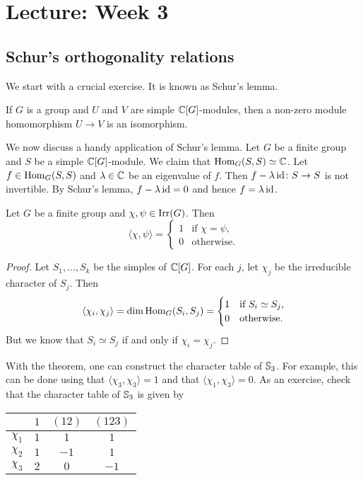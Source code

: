 \section{Lecture: Week 3}

\subsection{Schur's orthogonality relations}

We start with a crucial exercise. It is known as Schur's lemma. 

\begin{exercise}
\label{xca:Schur}
    If $G$ is a group and  
    $U$ and $V$ are simple $\mathbb{C}[G]$-modules, then 
    a non-zero module homomorphism $U\to V$ is an isomorphism. 
\end{exercise}

We now discuss a handy application of Schur's lemma. 
Let $G$ be a finite group and $S$ be a simple $\mathbb{C}[G]$-module.
We claim that $\operatorname{Hom}_G(S,S)\simeq\mathbb{C}$. Let 
$f\in\operatorname{Hom}_G(S,S)$ and $\lambda\in\mathbb{C}$ be an eigenvalue of $f$. Then 
$f-\lambda\operatorname{id}\colon S\to S$ is not invertible. By Schur's lemma, 
$f-\lambda\operatorname{id}=0$ and hence $f=\lambda\operatorname{id}$. 

\begin{theorem}[Schur]
    Let $G$ be a finite group and $\chi,\psi\in\operatorname{Irr}(G)$. Then
    \[
    \langle\chi,\psi\rangle=\begin{cases}
    1 & \text{if $\chi=\psi$,}\\
    0 & \text{otherwise.}
    \end{cases}
    \]
\end{theorem}

\begin{proof}
    Let $S_1,\dots,S_k$ be the simples of $\mathbb{C}[G]$. For each $j$, let
    $\chi_j$ be the irreducible character of $S_j$. Then 
    \[
    \langle\chi_i,\chi_j\rangle=\dim\operatorname{Hom}_G(S_i,S_j)
    =\begin{cases}
    1 & \text{if $S_i\simeq S_j$},\\
    0 & \text{otherwise.}
    \end{cases}
    \]
    But we know that $S_i\simeq S_j$ if and only if $\chi_i=\chi_j$. 
\end{proof}

With the theorem, one can construct the character table of $\mathbb{S}_3$.
For example, this can be done using that $\langle\chi_3,\chi_3\rangle=1$ 
and that $\langle\chi_1,\chi_3\rangle=0$. 
As an exercise, check that the character table of $\mathbb{S}_3$ 
is given by
    \begin{center}
		\begin{tabular}{|c|ccc|}
			\hline
			& $1$ & $(12)$ & $(123)$ \tabularnewline
			\hline 
			$\chi_{1}$ & $1$ & $1$ & $1$\tabularnewline
			$\chi_{2}$ & $1$ & $-1$ & $1$ \tabularnewline
			$\chi_{3}$ & $2$ & $0$ & $-1$ \tabularnewline
			\hline
		\end{tabular}
	\end{center}
	

